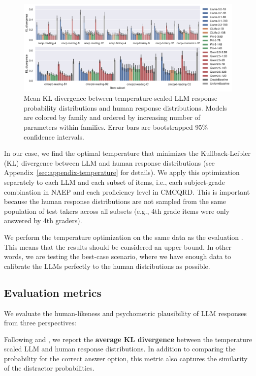 \documentclass[11pt]{article}
\begin{document}
\begin{figure}
  \centering
  \includegraphics[width=\textwidth]{figures/kldiv-optimized.pdf}
  \caption{Mean KL divergence between temperature-scaled LLM response probability distributions and human response distributions. Models are colored by family and ordered by increasing number of parameters within families. Error bars are bootstrapped 95\% confidence intervals.}
  \label{fig:kldiv-optimized}
\end{figure}

In our case, we find the optimal temperature that minimizes the Kullback-Leibler (KL) divergence between LLM and human response distributions (see Appendix~\ref{sec:appendix-temperature} for details). We apply this optimization separately to each LLM and each subset of items, i.e., each subject-grade combination in NAEP and each proficiency level in CMCQRD. This is important because the human response distributions are not sampled from the same population of test takers across all subsets (e.g., 4th grade items were only answered by 4th graders).

We perform the temperature optimization on the same data as the evaluation \citep[cf.][]{Baan2022,Liusie2023}. This means that the results should be considered an upper bound. In other words, we are testing the best-case scenario, where we have enough data to calibrate the LLMs perfectly to the human distributions as possible.

\subsection{Evaluation metrics}

We evaluate the human-likeness and psychometric plausibility of LLM responses from three perspectives:

Following \citet{Liusie2023} and \citet{Hayakawa2024}, we report the \textbf{average KL divergence} between the temperature scaled LLM and human response distributions. In addition to comparing the probability for the correct answer option, this metric also captures the similarity of the distractor probabilities.
\end{document}
